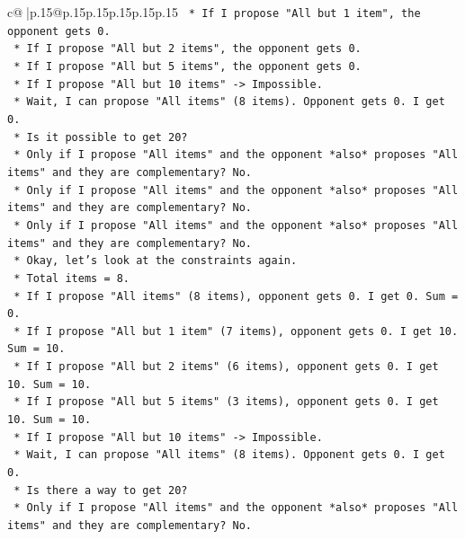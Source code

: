 \documentclass{article}
\begin{document}
{\begin{supertabular}{c@{$\;$}|p{.15\linewidth}@{}p{.15\linewidth}p{.15\linewidth}p{.15\linewidth}p{.15\linewidth}p{.15\linewidth}}
{{{\texttt{                *   If I propose "All but 1 item", the opponent gets 0.} \\
\texttt{                *   If I propose "All but 2 items", the opponent gets 0.} \\
\texttt{                *   If I propose "All but 5 items", the opponent gets 0.} \\
\texttt{                *   If I propose "All but 10 items" {-}> Impossible.} \\
\texttt{                *   Wait, I can propose "All items" (8 items). Opponent gets 0. I get 0.} \\
\texttt{                *   Is it possible to get 20?} \\
\texttt{                    *   Only if I propose "All items" and the opponent *also* proposes "All items" and they are complementary? No.} \\
\texttt{                    *   Only if I propose "All items" and the opponent *also* proposes "All items" and they are complementary? No.} \\
\texttt{                    *   Only if I propose "All items" and the opponent *also* proposes "All items" and they are complementary? No.} \\
\texttt{                *   Okay, let's look at the constraints again.} \\
\texttt{                *   Total items = 8.} \\
\texttt{                *   If I propose "All items" (8 items), opponent gets 0. I get 0. Sum = 0.} \\
\texttt{                *   If I propose "All but 1 item" (7 items), opponent gets 0. I get 10. Sum = 10.} \\
\texttt{                *   If I propose "All but 2 items" (6 items), opponent gets 0. I get 10. Sum = 10.} \\
\texttt{                *   If I propose "All but 5 items" (3 items), opponent gets 0. I get 10. Sum = 10.} \\
\texttt{                *   If I propose "All but 10 items" {-}> Impossible.} \\
\texttt{                *   Wait, I can propose "All items" (8 items). Opponent gets 0. I get 0.} \\
\texttt{                *   Is there a way to get 20?} \\
\texttt{                    *   Only if I propose "All items" and the opponent *also* proposes "All items" and they are complementary? No.} \\
}}}
\end{supertabular}}
\end{document}

